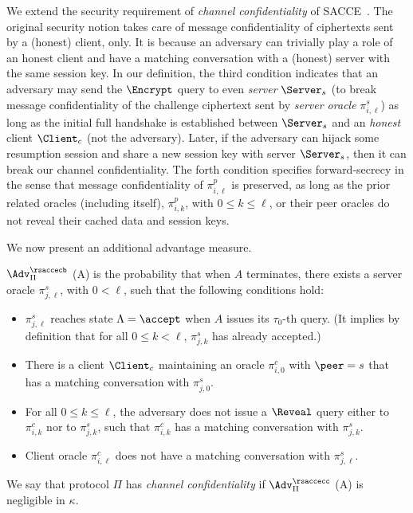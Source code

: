 \begin{remark}
We extend the security requirement of \textit{channel confidentiality} of SACCE~\cite{KPW13:SACCE}.
The original security notion takes care of message confidentiality of ciphertexts
sent by a (honest) client, only.  It is because an adversary can trivially play a role of an honest client and
have a matching conversation with a (honest) server with the same session key.
In our definition, the third condition indicates that an adversary may send
the $\Encrypt$ query to even \textit{server} $\Server_s$
(to break message confidentiality of the challenge ciphertext sent by \textit{server oracle} $\pi^s_{i,\ell}$)
as long as the initial full handshake is established between
$\Server_s$ and an \textit{honest} client $\Client_c$ (not the adversary).
Later, if the adversary can hijack some resumption session and
share a new session key with server $\Server_s$,
then it can break our channel confidentiality.
The forth condition specifies forward-secrecy in the sense that message confidentiality of $\pi^p_{i,\ell}$
is preserved, as long as the prior related oracles (including itself), $\pi^p_{i,k}$,
with $0\leq k\leq \ell$, or their peer oracles do not reveal their cached data and session keys.
\end{remark}

We now present an additional advantage measure.

\begin{definition} \label{def:rsacce-cb}
 $\Adv^{\rsaccecb}_{\Pi}$ (A) is the probability that when $A$ terminates, there exists
 a server oracle $\pi^s_{j, \ell}$, with $0< \ell$, such that the following conditions hold:

 \begin{itemize}
  \item{$\pi^s_{j,\ell}$ reaches state $\Lambda=\accept$ when $A$ issues
  its $\tau_0$-th query. (It implies by definition that for all $0\leq k < \ell$,
  $\pi^s_{j,k}$ has already accepted.)}

  \item{There is a client $\Client_c$ maintaining an oracle $\pi^c_{i,0}$ with $\peer=s$
  that has a matching conversation with $\pi^s_{j,0}$.}

  \item{For all $0\leq k \leq \ell$, the adversary does not issue a $\Reveal$ query either to
  $\pi^c_{i,k}$ nor to $\pi^s_{j,k}$,
  such that $\pi^c_{i,k}$ has a matching conversation with $\pi^s_{j,k}$.}

  \item{Client oracle $\pi^c_{i, \ell}$  does not have a matching conversation
  with $\pi^s_{j,\ell}$.}

 \end{itemize}
 We say that protocol $\Pi$ has \textit{channel confidentiality}
 if $\Adv^{\rsaccecc}_{\Pi}$ (A) is negligible in $\kappa$.
\end{definition}

